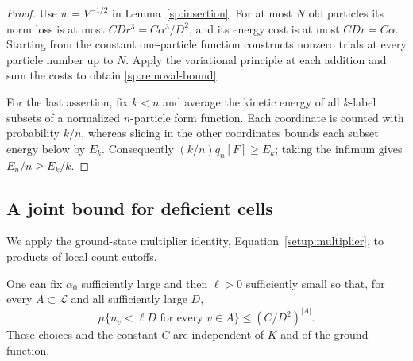 \begin{proof}
Use $w=V^{-1/2}$ in Lemma~\ref{sp:insertion}.  For at most $N$ old
particles its norm loss is at most $CDr^3=C\alpha^3/D^2$, and its
energy cost is at most $CDr=C\alpha$.  Starting from the constant
one-particle function constructs nonzero trials at every particle number
up to $N$.  Apply the variational principle at each addition and sum
the costs to obtain \eqref{sp:removal-bound}.

For the last assertion, fix $k<n$ and average the kinetic energy of
all $k$-label subsets of a normalized $n$-particle form function.  Each
coordinate is counted with probability $k/n$, whereas slicing in the
other coordinates bounds each subset energy below by $E_k$.
Consequently $(k/n)q_n[F]\ge E_k$; taking the infimum gives
$E_n/n\ge E_k/k$.
\end{proof}

\subsection{A joint bound for deficient cells}

We apply the ground-state multiplier identity,
Equation~\eqref{setup:multiplier}, to products of local count cutoffs.

\begin{proposition}\label{sp:low-counts}
One can fix $\alpha_0$ sufficiently large and then $\ell>0$ sufficiently
small so that, for every $A\subset\mathcal L$ and all sufficiently large
$D$,
\begin{equation}\label{sp:low-count-bound}
 \mu\{n_v<\ell D\text{ for every }v\in A\}
       \le (C/D^2)^{|A|}.
\end{equation}
These choices and the constant $C$ are independent of $K$ and of the
ground function.
\end{proposition}

